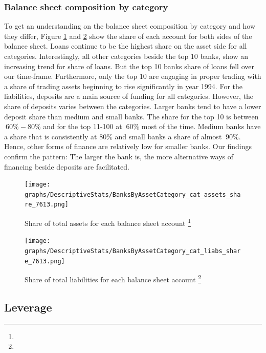 \documentclass[12pt, a4paper]{article} %
\begin{document}
\subsubsection{Balance sheet composition by category}

To get an understanding on the balance sheet composition by category and how they differ, Figure \ref{fig:catAssetsShare} and \ref{fig:catLiabShare} show the share of each account for both sides of the balance sheet. Loans continue to be the highest share on the asset side for all categories. Interestingly, all other categories beside the top 10 banks, show an increasing trend for share of loans. But the top 10 banks share of loans fell over our time-frame. Furthermore, only the top 10 are engaging in proper trading with a share of trading assets beginning to rise significantly in year 1994.
For the liabilities, deposits are a main source of funding for all categories. However, the share of deposits varies between the categories. Larger banks tend to have a lower deposit share than medium and small banks. The share for the top 10 is between $~60\%-80\%$ and for the top 11-100 at $~60\%$ most of the time. Medium banks have a share that is consistently at $80\%$ and small banks a share of almost $~90\%$. Hence, other forms of finance are relatively low for smaller banks. Our findings confirm the pattern: The larger the bank is, the more alternative ways of financing beside deposits are facilitated.


\begin{figure}[H]
\begin{minipage}{\textwidth}
\centering
\caption[1]{Share of total assets for each balance sheet account \footnote{} }
\texttt{[image: graphs/DescriptiveStats/BanksByAssetCategory\_cat\_assets\_share\_7613.png]}
\label{fig:catAssetsShare}
\end{minipage}
\end{figure}


\begin{figure}[H]
\begin{minipage}{\textwidth}
\centering
\caption[1]{Share of total liabilities for each balance sheet account \footnote{} }
\texttt{[image: graphs/DescriptiveStats/BanksByAssetCategory\_cat\_liabs\_share\_7613.png]}
\label{fig:catLiabShare}
\end{minipage}
\end{figure}

\newpage


\subsection{Leverage}
\end{document}
